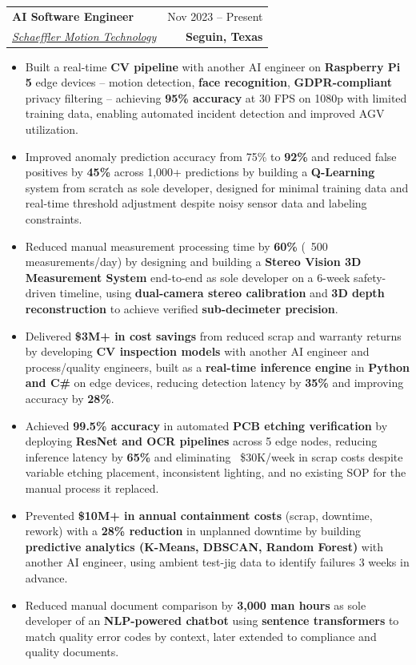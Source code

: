 \documentclass[letterpaper,11pt]{article}
\makeatletter
\newcommand{\resumeItem}[1]{
  \item\small{
    {#1 \vspace{-2pt}}
  }
}
\newcommand{\resumeSubheading}[4]{
  \vspace{-2pt}\item
    \begin{tabular*}{0.97\textwidth}[t]{l@{\extracolsep{\fill}}r}
      \textbf{#1} & #2 \\
      \textit{\small#3} & \textbf{\small #4} \\
    \end{tabular*}\vspace{-7pt}
}
\newcommand{\resumeItemListStart}{\begin{itemize}[itemsep=-1pt, leftmargin=0.1in]}
\newcommand{\resumeItemListEnd}{\end{itemize}\vspace{-7pt}}
\makeatother
\begin{document}
    \resumeSubheading
      {AI Software Engineer}{Nov 2023 -- Present}
      {\underline{Schaeffler Motion Technology}}{Seguin, Texas}
      \resumeItemListStart
        \resumeItem{Built a real-time \textbf{CV pipeline} with another AI engineer on \textbf{Raspberry Pi 5} edge devices -- motion detection, \textbf{face recognition}, \textbf{GDPR-compliant} privacy filtering -- achieving \textbf{95\% accuracy} at 30 FPS on 1080p with limited training data, enabling automated incident detection and improved AGV utilization.}
        \resumeItem{Improved anomaly prediction accuracy from 75\% to \textbf{92\%} and reduced false positives by \textbf{45\%} across 1,000+ predictions by building a \textbf{Q-Learning} system from scratch as sole developer, designed for minimal training data and real-time threshold adjustment despite noisy sensor data and labeling constraints.}
        \resumeItem{Reduced manual measurement processing time by \textbf{60\%} (~500 measurements/day) by designing and building a \textbf{Stereo Vision 3D Measurement System} end-to-end as sole developer on a 6-week safety-driven timeline, using \textbf{dual-camera stereo calibration} and \textbf{3D depth reconstruction} to achieve verified \textbf{sub-decimeter precision}.}
        \resumeItem{Delivered \textbf{\$3M+ in cost savings} from reduced scrap and warranty returns by developing \textbf{CV inspection models} with another AI engineer and process/quality engineers, built as a \textbf{real-time inference engine} in \textbf{Python and C\#} on edge devices, reducing detection latency by \textbf{35\%} and improving accuracy by \textbf{28\%}.}
        \resumeItem{Achieved \textbf{99.5\% accuracy} in automated \textbf{PCB etching verification} by deploying \textbf{ResNet and OCR pipelines} across 5 edge nodes, reducing inference latency by \textbf{65\%} and eliminating ~\$30K/week in scrap costs despite variable etching placement, inconsistent lighting, and no existing SOP for the manual process it replaced.}
        \resumeItem{Prevented \textbf{\$10M+ in annual containment costs} (scrap, downtime, rework) with a \textbf{28\% reduction} in unplanned downtime by building \textbf{predictive analytics (K-Means, DBSCAN, Random Forest)} with another AI engineer, using ambient test-jig data to identify failures 3 weeks in advance.}
        \resumeItem{Reduced manual document comparison by \textbf{3,000 man hours} as sole developer of an \textbf{NLP-powered chatbot} using \textbf{sentence transformers} to match quality error codes by context, later extended to compliance and quality documents.}
      \resumeItemListEnd
\end{document}
